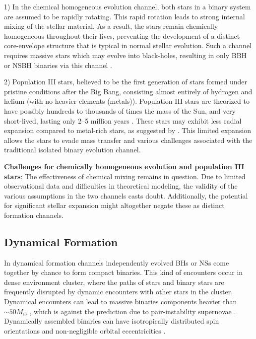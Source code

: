 1) In the chemical homogeneous evolution channel, both stars in a binary system are assumed to be rapidly rotating. This rapid rotation leads to strong internal mixing of the stellar material. As a result, the stars remain chemically homogeneous throughout their lives, preventing the development of a distinct core-envelope structure that is typical in normal stellar evolution. Such a channel requires massive stars which may evolve into black-holes, resulting in only BBH or NSBH binaries via this channel \cite{Marchant:2017ehn}. 

2) Population III stars, believed to be the first generation of stars formed under pristine conditions after the Big Bang, consisting almost entirely of hydrogen and helium (with no heavier elements (metals)). Population III stars are theorized to have possibly hundreds to thousands of times the mass of the Sun, and very short-lived, lasting only 2–5 million years \cite{Ohkubo:2009ft}. These stars may exhibit less radial expansion compared to metal-rich stars, as suggested by \cite{Marigo:2001pm}. This limited expansion allows the stars to evade mass transfer and various challenges associated with the traditional isolated binary evolution channel.

\textbf{Challenges for chemically homogeneous evolution and population III stars}: The effectiveness of chemical mixing remains in question. Due to limited observational data and difficulties in theoretical modeling, the validity of the various assumptions in the two channels casts doubt. Additionally, the potential for significant stellar expansion might altogether negate these as distinct formation channels.


\subsection{Dynamical Formation}

In dynamical formation channels independently evolved BHs or NSs come together by chance to form compact binaries. This kind of encounters occur in dense environment cluster, where the paths of stars and binary stars are frequently disrupted by dynamic encounters with other stars in the cluster. Dynamical encounters can lead to massive binaries components heavier than $\sim 50 M_{\odot}$ \cite{Gerosa:2017kvu,Rodriguez:2019huv}, which is against the prediction due to pair-instability supernovae \cite{Belczynski:2016jno,Woosley:2016hmi}. Dynamically assembled binaries can have isotropically distributed spin orientations \cite{Rodriguez:2016vmx,Talbot:2017yur} and non-negligible orbital eccentricities \cite{Gondan:2018khr,Rodriguez:2018pss}.

